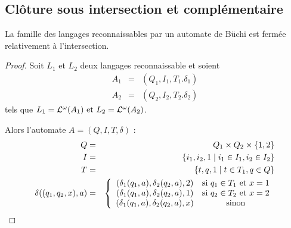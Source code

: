 \subsection{Clôture sous intersection et complémentaire}

\begin{prop}
	La famille des langages reconnaissables par un automate de Büchi est fermée relativement à l'intersection.
\end{prop}

\begin{proof}
	Soit $L_1$ et $L_2$ deux langages reconnaissable et soient
	\begin{eqnarray*}
		A_1 &=& (Q_1,I_1,T_1.\delta_1) \\
		A_2 &=& (Q_2,I_2,T_2.\delta_2)
	\end{eqnarray*}
	tels que $L_1 = \mathcal{L} ^ {\omega} (A_1) \text{ et }  L_2 = \mathcal{L} ^ {\omega} (A_2)$.

	Alors l'automate $A = (Q,I,T,\delta)$ :
	\begin{eqnarray*}
		Q &=& Q_1 \times Q_2 \times \left\{1,2\right\}  \\
		I &=& \left\{i_1,i_2,1 \mid i_1 \in I_1,i_2 \in I_2 \right\} \\
		T &=&  \left\{t,q,1 \mid t \in T_1, q \in Q\right\} \\
		\delta ((q_1,q_2,x), a) &=&
		\left\{
		\begin{array}{cc}
			(\delta_1(q_1,a), \delta_2 (q_2,a), 2) & \text {si } q_1 \in T_1 \text{ et } x = 1 \\
			(\delta_1(q_1,a), \delta_2 (q_2,a), 1) & \text {si } q_2 \in T_2 \text{ et } x = 2 \\
			(\delta_1(q_1,a), \delta_2 (q_2,a), x) & \text {sinon}
		\end{array}
		\right.
	\end{eqnarray*}
\end{proof}

